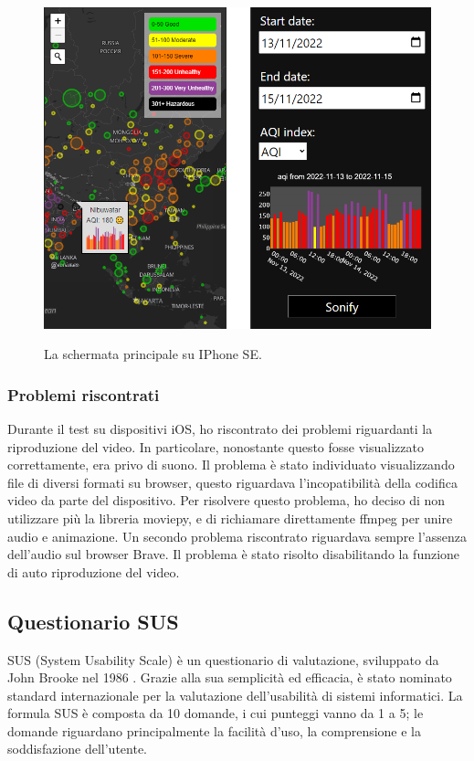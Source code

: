 \begin{figure}[h]
  \includegraphics[width=\linewidth]{img/mobile.png}
  \label{fig:mobile}
  \caption{La schermata principale su IPhone SE.}
\end{figure}

\subsubsection{Problemi riscontrati}
Durante il test su dispositivi iOS, ho riscontrato dei problemi riguardanti la riproduzione del video.
In particolare, nonostante questo fosse visualizzato correttamente, era privo di suono.
Il problema è stato individuato visualizzando file di diversi formati su browser, questo riguardava l'incopatibilità della codifica video da parte del dispositivo.
Per risolvere questo problema, ho deciso di non utilizzare più la libreria moviepy, e di richiamare direttamente ffmpeg per unire audio e animazione.
Un secondo problema riscontrato riguardava sempre l'assenza dell'audio sul browser Brave. Il problema è stato risolto disabilitando la funzione di auto riproduzione del video. 

\subsection{Questionario SUS}
SUS (System Usability Scale) è un questionario di valutazione, sviluppato da John Brooke nel 1986 \cite{sussurvey}.
Grazie alla sua semplicità ed efficacia, è stato nominato standard internazionale per la valutazione dell'usabilità di sistemi informatici.
La formula SUS è composta da 10 domande, i cui punteggi vanno da 1 a 5; le domande riguardano principalmente la facilità d'uso, la comprensione e la soddisfazione dell'utente.

